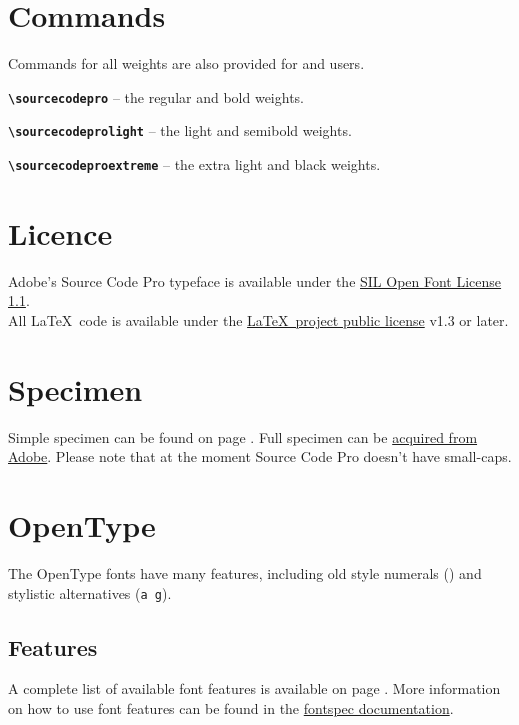 \documentclass[10pt,a4paper,english]{article}
\begin{document}
\begin{multicols}{2}
\section{Commands}
Commands for all weights are also provided for  and  users.
\begin{itemize*}
	\item \texttt{\bfseries \textbackslash sourcecodepro}
		-- the regular and bold weights.
	\item \texttt{\bfseries \textbackslash sourcecodeprolight}
		-- the light and semibold weights.
	\item \texttt{\bfseries \textbackslash sourcecodeproextreme}
		-- the extra light and black weights.
\end{itemize*}

\section{Licence}
Adobe's Source Code Pro typeface is available under the \href{http://scripts.sil.org/OFL}{SIL Open Font License 1.1}.\\
All \LaTeX\ code is available under the \href{http://www.latex-project.org/lppl/}{\LaTeX\ project public license} v1.3 or later.

\section{Specimen}
Simple specimen can be found on page \pageref{sec:specimen}. Full specimen can be \href{http://adobe-fonts.github.io/source-code-pro/}{acquired from Adobe}. Please note that at the moment Source Code Pro doesn’t have small-caps.

\section{OpenType}
The OpenType fonts have many features, including old style numerals (\texttt{})
and stylistic alternatives (\texttt{{a g}}).

\subsection{Features}
A complete list of available font features is available on page \pageref{sec:otfinfo}. More information on how to use font features can be found in the \href{http://mirror.ctan.org/macros/latex/contrib/fontspec/fontspec.pdf}{fontspec documentation}.


\end{multicols}
\end{document}
